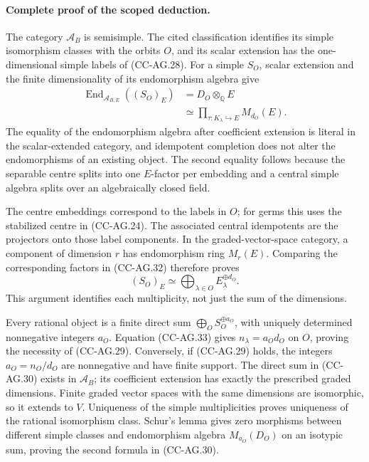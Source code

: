\documentclass[11pt,a4paper]{article}
\theoremstyle{definition}\newtheorem{definition}[theorem]{Definition}
\theoremstyle{remark}\newtheorem{remark}[theorem]{Remark}
\begin{document}
\paragraph{Complete proof of the scoped deduction.}
The category \(\mathcal A_B\) is semisimple.  The cited
classification identifies its simple isomorphism classes
with the orbits \(O\), and its scalar extension has the
one-dimensional simple labels of (CC-AG.28).
For a simple \(S_O\), scalar extension and the finite
dimensionality of its endomorphism algebra give
\[
 \begin{split}
 \operatorname{End}_{\mathcal A_{B,E}}((S_O)_E)
       &=D_O\otimes_{\mathbb Q}E\\
       &\simeq\prod_{\tau:K_\lambda\hookrightarrow E}M_{d_O}(E).
 \end{split}                                                \tag{CC-AG.32}
\]
The equality of the endomorphism algebra after coefficient
extension is literal in the scalar-extended category, and
idempotent completion does not alter the endomorphisms of
an existing object.  The second equality follows because
the separable centre splits into one \(E\)-factor per
embedding and a central simple algebra splits over an
algebraically closed field.

The centre embeddings correspond to the labels in \(O\);
for germs this uses the stabilized centre in (CC-AG.24).
The associated central idempotents are the projectors onto
those label components.  In the graded-vector-space
category, a component of dimension \(r\) has endomorphism
ring \(M_r(E)\).  Comparing the corresponding factors in
(CC-AG.32) therefore proves
\[
               (S_O)_E
                  \simeq\bigoplus_{\lambda\in O}
                                E_\lambda^{\oplus d_O}.      \tag{CC-AG.33}
\]
This argument identifies each multiplicity, not just the
sum of the dimensions.

Every rational object is a finite direct sum
\(\bigoplus_O S_O^{\oplus a_O}\), with uniquely determined
nonnegative integers \(a_O\).  Equation (CC-AG.33) gives
\(n_\lambda=a_Od_O\) on \(O\), proving the necessity of
(CC-AG.29).  Conversely, if (CC-AG.29) holds, the integers
\(a_O=n_O/d_O\) are nonnegative and have finite support.
The direct sum in (CC-AG.30) exists in \(\mathcal A_B\);
its coefficient extension has exactly the prescribed
graded dimensions.  Finite graded vector spaces with the
same dimensions are isomorphic, so it extends to \(V\).
Uniqueness of the simple multiplicities proves uniqueness
of the rational isomorphism class.  Schur's lemma gives
zero morphisms between different simple classes and
endomorphism algebra \(M_{a_O}(D_O)\) on an isotypic sum,
proving the second formula in (CC-AG.30).
\end{document}
